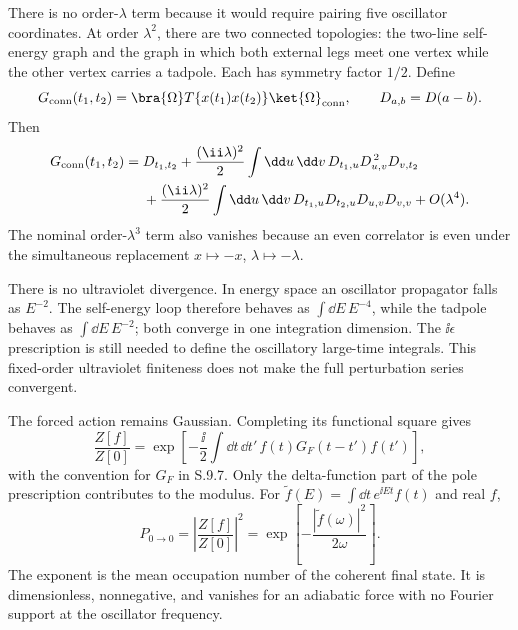 \begin{enumerate}
\begin{enumerate}
There is no order-\(\lambda\) term because it would require pairing five
oscillator coordinates.  At order \(\lambda^2\), there are two connected
topologies: the two-line self-energy graph and the graph in which both
external legs meet one vertex while the other vertex carries a tadpole.
Each has symmetry factor \(1/2\).  Define
\[
 G_{\rm conn}(t_1,t_2)
 =\bra{\Omega}T\{x(t_1)x(t_2)\}\ket{\Omega}_{\rm conn},
 \qquad D_{a,b}=D(a-b).
\]
Then
\[
\begin{aligned}
 G_{\rm conn}(t_1,t_2)
 ={}&D_{t_1,t_2}
 +\frac{(\ii\lambda)^2}{2}\int \dd u\,\dd v\,
 D_{t_1,u}D_{u,v}^{\,2}D_{v,t_2}\\
 &+\frac{(\ii\lambda)^2}{2}\int \dd u\,\dd v\,
 D_{t_1,u}D_{t_2,u}D_{u,v}D_{v,v}
 +O(\lambda^4).
\end{aligned}
\]
The nominal order-\(\lambda^3\) term also vanishes because an even
correlator is even under the simultaneous replacement
\(x\mapsto-x\), \(\lambda\mapsto-\lambda\).

There is no ultraviolet divergence.  In energy space an oscillator
propagator falls as \(E^{-2}\).  The self-energy loop therefore behaves as
\(\int \dd E\,E^{-4}\), while the tadpole behaves as
\(\int \dd E\,E^{-2}\); both converge in one integration dimension.  The
\(\ii\epsilon\) prescription is still needed to define the oscillatory
large-time integrals.  This fixed-order ultraviolet finiteness does not
make the full perturbation series convergent.
\end{enumerate}

The forced action remains Gaussian.  Completing its functional square gives
\[
 \frac{Z[f]}{Z[0]}
 =\exp\left[-\frac{\ii}{2}\int \dd t\,\dd t'\,
 f(t)G_F(t-t')f(t')\right],
\]
with the convention for \(G_F\) in S.9.7.  Only the delta-function part of
the pole prescription contributes to the modulus.  For
\(\widetilde f(E)=\int \dd t\,e^{\ii Et}f(t)\) and real \(f\),
\[
 \boxed{\quad
 P_{0\to0}=\left|\frac{Z[f]}{Z[0]}\right|^2
 =\exp\left[-\frac{|\widetilde f(\omega)|^2}{2\omega}\right].
 \quad}
\]
The exponent is the mean occupation number of the coherent final state.
It is dimensionless, nonnegative, and vanishes for an adiabatic force with
no Fourier support at the oscillator frequency.


\end{enumerate}
